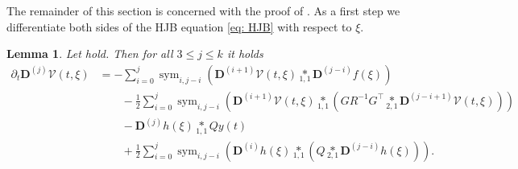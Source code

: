 \documentclass[11pt,reqno]{amsart}
\numberwithin{equation}{section}
\theoremstyle{plain}
\newtheorem{lemma}{Lemma}
\DeclareMathOperator{\Sym}{sym}
\newcommand{\tenp}[2]{\underset{#1,#2}{*}}
\newcommand{\TenDeriv}[1]{\mathbf{D}^{(#1)}}
\begin{document}
The remainder of this section is concerned with the proof of .
As a first step we differentiate both sides of the HJB equation \eqref{eq: HJB} with respect to $\xi$.
%
\begin{lemma}\label{LEM:HigherDerivativeHJB}
    Let  hold. Then for all $3 \leq j \leq k$ it holds
    \begin{equation}
    \begin{aligned}\label{EQ:HigherDerivativeHJB}
        \partial_t \TenDeriv{j} \mathcal{V}(t,\xi) &= -\sum_{i=0}^{j} \Sym_{i,j-i}\left( \TenDeriv{i+1} \mathcal{V}(t,\xi) \tenp{1}{1}\TenDeriv{j-i}f(\xi) \right)
        \\ 
        &\qquad - \frac{1}{2}\sum_{i=0}^{j} \Sym_{i,j-i}\left( \TenDeriv{i+1} \mathcal{V}(t,\xi) \tenp{1}{1} \left( G R^{-1}G^\top \tenp{2}{1}\TenDeriv{j-i+1} \mathcal{V}(t,\xi) \right) \right)
        \\
        &\qquad - \TenDeriv{j} h(\xi) \tenp{1}{1} Q y(t) 
        \\
        & \qquad + \frac{1}{2} \sum_{i=0}^{j} \Sym_{i,j-i} \left(\TenDeriv{i} h(\xi) \tenp{1}{1} \left(Q \tenp{2}{1} \TenDeriv{j-i} h(\xi)\right) \right).
    \end{aligned}
    \end{equation}
\end{lemma}
\end{document}
